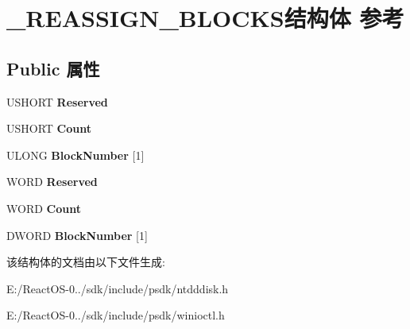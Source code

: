 \hypertarget{struct___r_e_a_s_s_i_g_n___b_l_o_c_k_s}{}\section{\+\_\+\+R\+E\+A\+S\+S\+I\+G\+N\+\_\+\+B\+L\+O\+C\+K\+S结构体 参考}
\label{struct___r_e_a_s_s_i_g_n___b_l_o_c_k_s}
\subsection*{Public 属性}
\begin{DoxyCompactItemize}
\item 
\mbox{\label{struct___r_e_a_s_s_i_g_n___b_l_o_c_k_s_a3fb6808d4ac135f8ac72b89e3d70c967}} 
U\+S\+H\+O\+RT {\bfseries Reserved}
\item 
\mbox{\label{struct___r_e_a_s_s_i_g_n___b_l_o_c_k_s_ac05a77a6a9e9ee6478352f31b64c563c}} 
U\+S\+H\+O\+RT {\bfseries Count}
\item 
\mbox{\label{struct___r_e_a_s_s_i_g_n___b_l_o_c_k_s_a1e867a9541c3de3ca8639f9fbc3bfefd}} 
U\+L\+O\+NG {\bfseries Block\+Number} \mbox{[}1\mbox{]}
\item 
\mbox{\label{struct___r_e_a_s_s_i_g_n___b_l_o_c_k_s_a3fb6808d4ac135f8ac72b89e3d70c967}} 
W\+O\+RD {\bfseries Reserved}
\item 
\mbox{\label{struct___r_e_a_s_s_i_g_n___b_l_o_c_k_s_ac05a77a6a9e9ee6478352f31b64c563c}} 
W\+O\+RD {\bfseries Count}
\item 
\mbox{\label{struct___r_e_a_s_s_i_g_n___b_l_o_c_k_s_aaaa5a3986d01290908db1783dd084dfc}} 
D\+W\+O\+RD {\bfseries Block\+Number} \mbox{[}1\mbox{]}
\end{DoxyCompactItemize}


该结构体的文档由以下文件生成\+:\begin{DoxyCompactItemize}
\item 
E\+:/\+React\+O\+S-\/0../sdk/include/psdk/ntdddisk.\+h\item 
E\+:/\+React\+O\+S-\/0../sdk/include/psdk/winioctl.\+h\end{DoxyCompactItemize}
